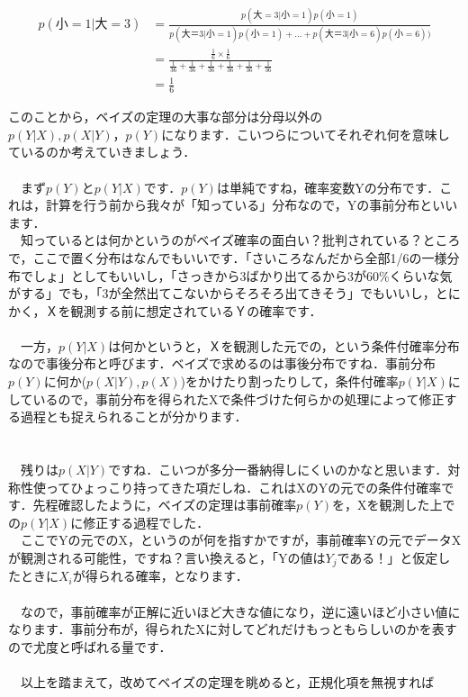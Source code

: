 \documentclass[11pt,a4paper,uplatex]{ujreport} 	%
\begin{document}
\begin{align}
p(小=1|大=3) &= \frac{p(大=3|小=1)p(小=1)}{p(大＝3|小=1)p(小=1) + ... + p(大＝3|小=6)p(小=6))}\\
&= \frac{\frac{1}{6} \times \frac{1}{6}}{\frac{1}{36} + \frac{1}{36} + \frac{1}{36} + \frac{1}{36} + \frac{1}{36}+ \frac{1}{36}}\\
&= \frac{1}{6}
\end{align}

このことから，ベイズの定理の大事な部分は分母以外の$p(Y|X), p(X|Y)，p(Y)$になります．こいつらについてそれぞれ何を意味しているのか考えていきましょう．\\
\\
　まず$p(Y)$と$p(Y|X)$です．$p(Y)$は単純ですね，確率変数Yの分布です．これは，計算を行う前から我々が「知っている」分布なので，Yの事前分布といいます．\\
　知っているとは何かというのがベイズ確率の面白い？批判されている？ところで，ここで置く分布はなんでもいいです．「さいころなんだから全部1/6の一様分布でしょ」としてもいいし，「さっきから3ばかり出てるから3が60\%くらいな気がする」でも，「3が全然出てこないからそろそろ出てきそう」でもいいし，とにかく，Ｘを観測する前に想定されているＹの確率です．\\
\\
　一方，$p(Y|X)$は何かというと，Ｘを観測した元での，という条件付確率分布なので事後分布と呼びます．ベイズで求めるのは事後分布ですね．事前分布$p(Y)$に何か($p(X|Y), p(X)$)をかけたり割ったりして，条件付確率$p(Y|X)$にしているので，事前分布を得られたXで条件づけた何らかの処理によって修正する過程とも捉えられることが分かります．\\
\\
\\
　残りは$p(X|Y)$ですね．こいつが多分一番納得しにくいのかなと思います．対称性使ってひょっこり持ってきた項だしね．これはXのYの元での条件付確率です．先程確認したように，ベイズの定理は事前確率$p(Y)$を，Xを観測した上での$p(Y|X)$に修正する過程でした．\\
　ここでYの元でのX，というのが何を指すかですが，事前確率Yの元でデータXが観測される可能性，ですね？言い換えると，「Yの値は$Y_j$である！」と仮定したときに$X_i$が得られる確率，となります．\\
\\
　なので，事前確率が正解に近いほど大きな値になり，逆に遠いほど小さい値になります．事前分布が，得られたXに対してどれだけもっともらしいのかを表すので尤度と呼ばれる量です．\\
\\
　以上を踏まえて，改めてベイズの定理を眺めると，正規化項を無視すれば
\end{document}
